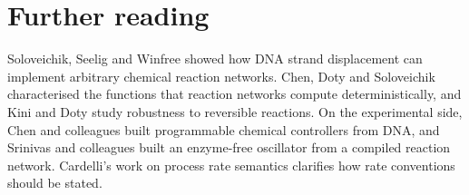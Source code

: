 \section*{Further reading}
Soloveichik, Seelig and Winfree showed how DNA strand displacement can
implement arbitrary chemical reaction networks.\cite{Soloveichik2010} Chen, Doty
and Soloveichik characterised the functions that reaction networks compute
deterministically,\cite{Chen2014} and Kini and Doty study robustness to
reversible reactions.\cite{KiniDoty2026} On the experimental side, Chen and
colleagues built programmable chemical controllers from DNA,\cite{Chen2013} and
Srinivas and colleagues built an enzyme-free oscillator from a compiled reaction
network.\cite{Srinivas2017} Cardelli's work on process rate semantics clarifies
how rate conventions should be stated.\cite{Cardelli2008}
